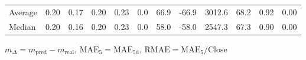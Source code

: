 \begin{threeparttable}
{\begin{tabular}{lrrrrrrrrrrr}
Average &          0.20 &          0.17 &          0.20 &        0.23 &                 0.0 &                66.9 &      -66.9 &              3012.6 &             68.2 &            0.92 &                   0.00 \\
 Median &          0.20 &          0.16 &          0.20 &        0.23 &                 0.0 &                58.0 &      -58.0 &              2547.3 &             67.3 &            0.90 &                   0.00 \\
\bottomrule
\end{tabular}
}
\begin{tablenotes}\footnotesize
\item $m_\Delta=m_{\text{pred}}-m_{\text{real}}$,
$\mathrm{MAE}_5=\mathrm{MAE}_{5\text{d}}$,
$\mathrm{RMAE}=\mathrm{MAE}_5/\text{Close}$
\end{tablenotes}
\end{threeparttable}
\endgroup


